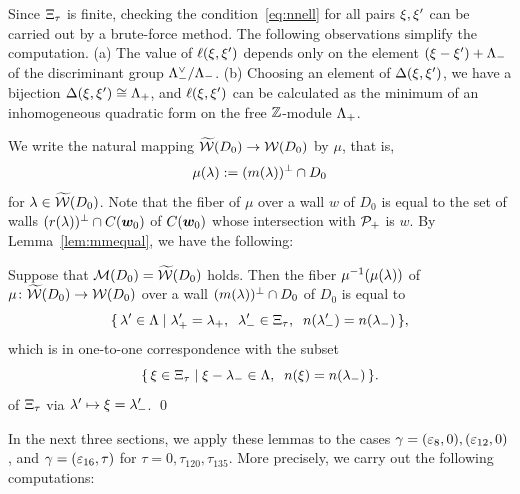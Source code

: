 \documentclass{amsart} %
\begin{document}
%
\begin{remark}\label{rem:MMMtilwalls}
Since $\Xi_{\tau}$ is finite,
checking the condition~\eqref{eq:nnell} for all pairs $\xi, \xi^{\prime}$
 can be carried out by a brute-force method.
The following observations simplify the computation.
(a) 
The value of $\ell(\xi, \xi^{\prime})$ depends only on the element $(\xi-\xi^{\prime})+\Lambda_{-}$
of the discriminant group $\Lambda_{-}^{\vee}/\Lambda_{-}$.
(b) 
Choosing an element of $\Delta(\xi, \xi^{\prime})$, 
we have a bijection $\Delta(\xi, \xi^{\prime})\cong \Lambda_{+}$,
and $\ell(\xi, \xi^{\prime})$ can be calculated as the minimum of
an inhomogeneous quadratic form on the free $\mathord{\mathbb{Z}}$-module $\Lambda_{+}$.
\end{remark}
%
We write the natural mapping
$\widetilde{\mathord{\mathcal{W}}}(D_0)\to \mathord{\mathcal{W}}(D_0)$
by $\mu$, that is, 
\[
\mu(\lambda):=(m(\lambda))^{\perp}\cap D_0
\]
for $\lambda\in \widetilde{\mathord{\mathcal{W}}}(D_0)$.
Note that the fiber of $\mu$ over a wall $w$
of $D_0$ is equal to the set of walls $(r(\lambda))^{\perp}\cap \mathord{C}(\boldsymbol{w}_0)$
of $\mathord{C}(\boldsymbol{w}_0)$ whose intersection with $\mathord{\mathcal{P}}_{+}$ is $w$.
By Lemma~\ref{lem:mmequal}, we have the following:
%
\begin{lemma}\label{lem:wallfiber}
Suppose that $\mathord{\mathcal{M}}(D_0)=\widetilde{\mathord{\mathcal{W}}} (D_0)$ holds.
Then the fiber $\mu^{-1}(\mu(\lambda))$ of %
$\mu\colon \widetilde{\mathord{\mathcal{W}}}(D_0)\to \mathord{\mathcal{W}}(D_0)$
over a wall $(m(\lambda))^{\perp}\cap D_0$ of $D_0$
is equal to
\[
\set{\lambda\sprime\in \Leech}%
{\lambdaplus\sprime=\lambdaplus, \;\; \lambdaminus\sprime\in \Xitau, \;\; n(\lambdaminus\sprime)=n(\lambdaminus)},
\]
which is in one-to-one correspondence with the subset 
\[
\{\,{\xi\in \Xi_{\tau}}\mid {\xi-{\lambda}_{-}\in \Lambda, \;\; n(\xi)=n({\lambda}_{-})} \,\}.
\]
of $\Xi_{\tau}$ via $\lambda^{\prime} \mapsto \xi={\lambda}_{-}^{\prime}$.
\qed
\end{lemma}
%
In the next three sections, we apply these lemmas to the cases $\gamma=(\varepsilon_8, 0), (\varepsilon_{12}, 0)$,
and $\gamma=(\varepsilon_{16}, \tau)$ for $\tau=0, \tau_{120}, \tau_{135}$.
More precisely,
we carry out the following computations:
%
\end{document}
